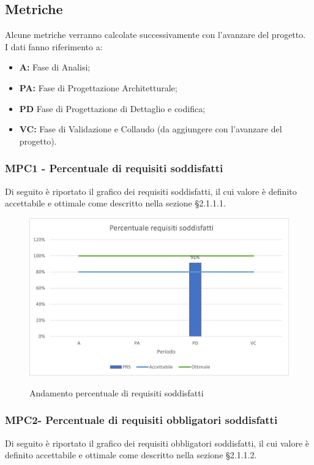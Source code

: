 \subsection{Metriche}
Alcune metriche verranno calcolate successivamente con l'avanzare del progetto.\\

I dati fanno riferimento a:
\begin{itemize}
	\item \textbf{A:} Fase di Analisi;
	\item \textbf{PA:} Fase di Progettazione Architetturale;
	\item \textbf{PD} Fase di Progettazione di Dettaglio e codifica;
	\item \textbf{VC: } Fase di Validazione e Collaudo (da aggiungere con l'avanzare del progetto).
\end{itemize}

\subsubsection{MPC1 - Percentuale di requisiti soddisfatti}
Di seguito è riportato il grafico dei requisiti soddisfatti, il cui valore è definito accettabile e ottimale come descritto nella sezione §2.1.1.1.\\

\begin{figure}[H]
\centering
\includegraphics[scale=0.78]{res/ResocontoAttivitaDiVerifica/res/metriche/grafici/img/PRS.png}\\
\caption{Andamento percentuale di requisiti soddisfatti}
\end{figure}

\subsubsection{MPC2- Percentuale di requisiti obbligatori soddisfatti}
Di seguito è riportato il grafico dei requisiti obbligatori soddisfatti, il cui valore è definito accettabile e ottimale come descritto nella sezione §2.1.1.2.\\

